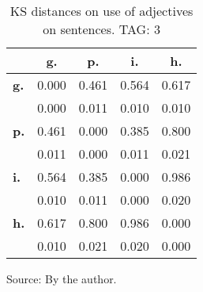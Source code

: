 \begin{table}[h!]
\begin{center}
\caption{KS distances on use of adjectives on sentences. TAG: 3}
\begin{tabular}{| l || c | c | c | c |}\hline
 & {\bf g.} & {\bf p.} & {\bf i.} & {\bf h.} \\\hline\hline
{\bf g.} & 0.000 & 0.461 & 0.564 & 0.617 \\
{\bf } & 0.000 & 0.011 & 0.010 & 0.010 \\\hline
{\bf p.} & 0.461 & 0.000 & 0.385 & 0.800 \\
{\bf } & 0.011 & 0.000 & 0.011 & 0.021 \\\hline
{\bf i.} & 0.564 & 0.385 & 0.000 & 0.986 \\
{\bf } & 0.010 & 0.011 & 0.000 & 0.020 \\\hline
{\bf h.} & 0.617 & 0.800 & 0.986 & 0.000 \\
{\bf } & 0.010 & 0.021 & 0.020 & 0.000 \\\hline
\end{tabular}
\begin{flushleft}\footnotesize
		Source: By the author.\
\end{flushleft}
\end{center}
\end{table}
